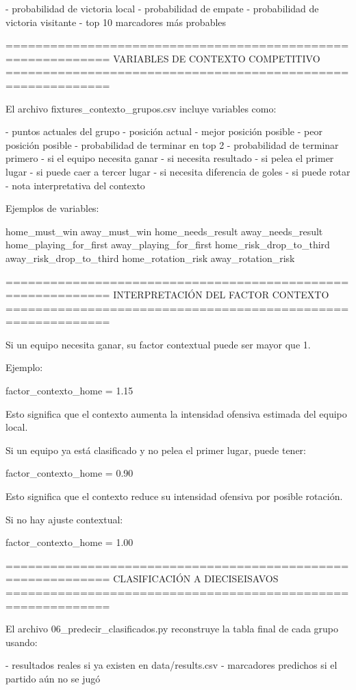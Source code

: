 - probabilidad de victoria local
- probabilidad de empate
- probabilidad de victoria visitante
- top 10 marcadores más probables

============================================================
VARIABLES DE CONTEXTO COMPETITIVO
============================================================

El archivo fixtures_contexto_grupos.csv incluye variables como:

- puntos actuales del grupo
- posición actual
- mejor posición posible
- peor posición posible
- probabilidad de terminar en top 2
- probabilidad de terminar primero
- si el equipo necesita ganar
- si necesita resultado
- si pelea el primer lugar
- si puede caer a tercer lugar
- si necesita diferencia de goles
- si puede rotar
- nota interpretativa del contexto

Ejemplos de variables:

home_must_win
away_must_win
home_needs_result
away_needs_result
home_playing_for_first
away_playing_for_first
home_risk_drop_to_third
away_risk_drop_to_third
home_rotation_risk
away_rotation_risk

============================================================
INTERPRETACIÓN DEL FACTOR CONTEXTO
============================================================

Si un equipo necesita ganar, su factor contextual puede ser mayor que 1.

Ejemplo:

factor_contexto_home = 1.15

Esto significa que el contexto aumenta la intensidad ofensiva estimada del equipo local.

Si un equipo ya está clasificado y no pelea el primer lugar, puede tener:

factor_contexto_home = 0.90

Esto significa que el contexto reduce su intensidad ofensiva por posible rotación.

Si no hay ajuste contextual:

factor_contexto_home = 1.00

============================================================
CLASIFICACIÓN A DIECISEISAVOS
============================================================

El archivo 06_predecir_clasificados.py reconstruye la tabla final de cada grupo usando:

- resultados reales si ya existen en data/results.csv
- marcadores predichos si el partido aún no se jugó

